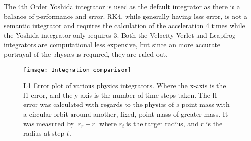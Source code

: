 The 4th Order Yoshida integrator is used as the default integrator as there is a balance of performance and error. RK4, while generally having less error, is not a semantic integrator and requires the calculation of the acceleration 4 times while the Yoshida integrator only requires 3. Both the Velocity Verlet and Leapfrog integrators are computational less expensive, but since an more accurate portrayal of the physics is required, they are ruled out.

\begin{figure} 
\centering 
\texttt{[image: Integration\_comparison]}
\caption{L1 Error plot of various physics integrators. Where the x-axis is the l1 error, and the y-axis is the number of time steps taken. The l1 error was calculated with regards to the physics of a point mass with a circular orbit around another, fixed, point mass of greater mass. It was measured by $|r_r-r|$ where $r_t$ is the target radius, and $r$ is the radius at step $t$.} \label{fig:integratorerror}
\end{figure} 
